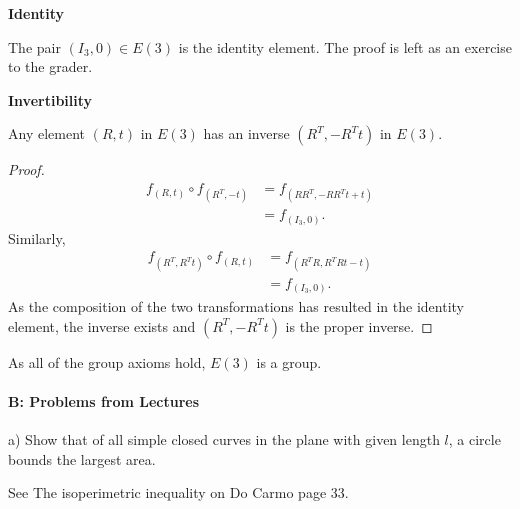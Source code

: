 \documentclass[12pt,letterpaper,boxed]{hmcpset}
\begin{document}
\begin{solution}
\textbf{Identity}

The pair $(I_3, 0) \in E(3)$ is the identity element. The proof is left as an exercise to the grader.

\textbf{Invertibility}

Any element $(R, t)$ in $E(3)$ has an inverse $(R^T, -R^Tt)$ in $E(3)$.

\begin{proof}
\begin{align*}
    f_{(R, t)} \circ f_{(R^T, -t)} 
    &= f_{(RR^T, -RR^Tt + t)} \\
    &= f_{(I_3, 0)}.
\end{align*}
Similarly,
\begin{align*}
    f_{(R^T, R^Tt)} \circ f_{(R, t)} 
    &= f_{(R^TR, R^TRt - t)} \\
    &= f_{(I_3, 0)}.
\end{align*}
As the composition of the two transformations has resulted in the identity element, the inverse exists and $(R^T, -R^Tt)$ is the proper inverse. 

\end{proof}

As all of the group axioms hold, $E(3)$ is a group.

 
\end{solution}
\medskip
\paragraph{B: Problems from Lectures}

\begin{itemize}
{\item a) Show that of all simple closed curves in the plane with 
given length $l$, a circle bounds the largest area.}
\begin{solution}
See The isoperimetric inequality on Do Carmo page 33.
\end{solution}
\end{itemize}
\end{document}
